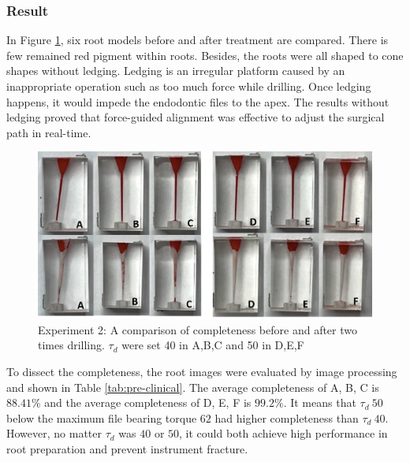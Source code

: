 \subsubsection{Result}
\hspace*{6mm}In Figure \ref{fig: exp2_roots}, six root models before and after treatment are compared. There is few remained red pigment within roots. Besides, the roots were all shaped to cone shapes without ledging. Ledging is an irregular platform caused by an inappropriate operation such as too much force while drilling. Once ledging happens, it would impede the endodontic files to the apex. The results without ledging proved that force-guided alignment was effective to adjust the surgical path in real-time.
\begin{figure}[htbp]
\begin{center}
\includegraphics[width=0.9\linewidth]{Images/exp/roots.png}
\caption{Experiment 2: A comparison of completeness before and after two times drilling. $\tau_d$ were set 40 in A,B,C and 50 in D,E,F}
\label{fig: exp2_roots}
\end{center}
\end{figure}	
\par
To dissect the completeness, the root images were evaluated by image processing and shown in Table \ref{tab:pre-clinical}. The average completeness of A, B, C is $88.41\%$ and the average completeness of D, E, F is $99.2\%$. It means that $\tau_d\ 50$ below the maximum file bearing torque $62$ had higher completeness than  $\tau_d\ 40$. However, no matter $\tau_d$ was $40$ or $50$, it could both achieve high performance in root preparation and prevent instrument fracture.

